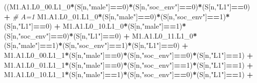\documentclass[
]{book}
\newenvironment{Shaded}{\begin{snugshade}}{\end{snugshade}}
\newcommand{\CommentTok}[1]{\textcolor[rgb]{0.56,0.35,0.01}{\textit{#1}}}
\newcommand{\DecValTok}[1]{\textcolor[rgb]{0.00,0.00,0.81}{#1}}
\newcommand{\NormalTok}[1]{#1}
\newcommand{\SpecialCharTok}[1]{\textcolor[rgb]{0.81,0.36,0.00}{\textbf{#1}}}
\newcommand{\StringTok}[1]{\textcolor[rgb]{0.31,0.60,0.02}{#1}}
\begin{document}
\begin{Shaded}
\begin{Highlighting}[]
\NormalTok{      ((M1.A1.L0\_00.L1\_0}\SpecialCharTok{*}\NormalTok{(S[n,}\StringTok{"male"}\NormalTok{]}\SpecialCharTok{==}\DecValTok{0}\NormalTok{)}\SpecialCharTok{*}\NormalTok{(S[n,}\StringTok{"soc\_env"}\NormalTok{]}\SpecialCharTok{==}\DecValTok{0}\NormalTok{)}\SpecialCharTok{*}\NormalTok{(S[n,}\StringTok{"L1"}\NormalTok{]}\SpecialCharTok{==}\DecValTok{0}\NormalTok{) }\SpecialCharTok{+} \CommentTok{\# A\textquotesingle{}=1}
\NormalTok{          M1.A1.L0\_01.L1\_0}\SpecialCharTok{*}\NormalTok{(S[n,}\StringTok{"male"}\NormalTok{]}\SpecialCharTok{==}\DecValTok{0}\NormalTok{)}\SpecialCharTok{*}\NormalTok{(S[n,}\StringTok{"soc\_env"}\NormalTok{]}\SpecialCharTok{==}\DecValTok{1}\NormalTok{)}\SpecialCharTok{*}\NormalTok{(S[n,}\StringTok{"L1"}\NormalTok{]}\SpecialCharTok{==}\DecValTok{0}\NormalTok{) }\SpecialCharTok{+}
\NormalTok{          M1.A1.L0\_10.L1\_0}\SpecialCharTok{*}\NormalTok{(S[n,}\StringTok{"male"}\NormalTok{]}\SpecialCharTok{==}\DecValTok{1}\NormalTok{)}\SpecialCharTok{*}\NormalTok{(S[n,}\StringTok{"soc\_env"}\NormalTok{]}\SpecialCharTok{==}\DecValTok{0}\NormalTok{)}\SpecialCharTok{*}\NormalTok{(S[n,}\StringTok{"L1"}\NormalTok{]}\SpecialCharTok{==}\DecValTok{0}\NormalTok{) }\SpecialCharTok{+} 
\NormalTok{          M1.A1.L0\_11.L1\_0}\SpecialCharTok{*}\NormalTok{(S[n,}\StringTok{"male"}\NormalTok{]}\SpecialCharTok{==}\DecValTok{1}\NormalTok{)}\SpecialCharTok{*}\NormalTok{(S[n,}\StringTok{"soc\_env"}\NormalTok{]}\SpecialCharTok{==}\DecValTok{1}\NormalTok{)}\SpecialCharTok{*}\NormalTok{(S[n,}\StringTok{"L1"}\NormalTok{]}\SpecialCharTok{==}\DecValTok{0}\NormalTok{) }\SpecialCharTok{+}
\NormalTok{          M1.A1.L0\_00.L1\_1}\SpecialCharTok{*}\NormalTok{(S[n,}\StringTok{"male"}\NormalTok{]}\SpecialCharTok{==}\DecValTok{0}\NormalTok{)}\SpecialCharTok{*}\NormalTok{(S[n,}\StringTok{"soc\_env"}\NormalTok{]}\SpecialCharTok{==}\DecValTok{0}\NormalTok{)}\SpecialCharTok{*}\NormalTok{(S[n,}\StringTok{"L1"}\NormalTok{]}\SpecialCharTok{==}\DecValTok{1}\NormalTok{) }\SpecialCharTok{+}
\NormalTok{          M1.A1.L0\_01.L1\_1}\SpecialCharTok{*}\NormalTok{(S[n,}\StringTok{"male"}\NormalTok{]}\SpecialCharTok{==}\DecValTok{0}\NormalTok{)}\SpecialCharTok{*}\NormalTok{(S[n,}\StringTok{"soc\_env"}\NormalTok{]}\SpecialCharTok{==}\DecValTok{1}\NormalTok{)}\SpecialCharTok{*}\NormalTok{(S[n,}\StringTok{"L1"}\NormalTok{]}\SpecialCharTok{==}\DecValTok{1}\NormalTok{) }\SpecialCharTok{+}
\NormalTok{          M1.A1.L0\_10.L1\_1}\SpecialCharTok{*}\NormalTok{(S[n,}\StringTok{"male"}\NormalTok{]}\SpecialCharTok{==}\DecValTok{1}\NormalTok{)}\SpecialCharTok{*}\NormalTok{(S[n,}\StringTok{"soc\_env"}\NormalTok{]}\SpecialCharTok{==}\DecValTok{0}\NormalTok{)}\SpecialCharTok{*}\NormalTok{(S[n,}\StringTok{"L1"}\NormalTok{]}\SpecialCharTok{==}\DecValTok{1}\NormalTok{) }\SpecialCharTok{+}

\end{Highlighting}
\end{Shaded}
\end{document}
